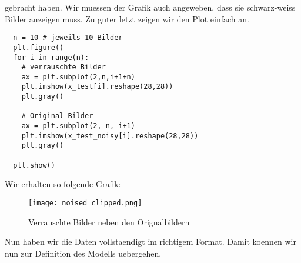 gebracht haben. Wir muessen der Grafik auch angeweben, dass sie schwarz-weiss
Bilder anzeigen muss. Zu guter letzt zeigen wir den Plot einfach an.
\begin{verbatim}
  n = 10 # jeweils 10 Bilder
  plt.figure()
  for i in range(n):
    # verrauschte Bilder
    ax = plt.subplot(2,n,i+1+n)
    plt.imshow(x_test[i].reshape(28,28))
    plt.gray()

    # Original Bilder
    ax = plt.subplot(2, n, i+1)
    plt.imshow(x_test_noisy[i].reshape(28,28))
    plt.gray()

  plt.show()
\end{verbatim}
Wir erhalten so folgende Grafik:
\begin{figure}[h!]
  \centering
  \texttt{[image: noised\_clipped.png]}
  \caption{Verrauschte Bilder neben den Orignalbildern}
\end{figure}

\para{}
Nun haben wir die Daten vollstaendigt im richtigem Format. Damit koennen wir nun
zur Definition des Modells uebergehen.



